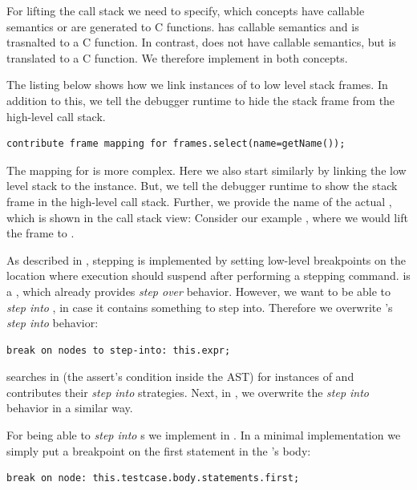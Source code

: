  For lifting the call stack we need to specify, which
concepts have callable semantics or are generated to C functions. 
 has callable semantics and is trasnalted to a C
function. In contrast,  does not have callable
semantics, but is translated to a C function. We therefore implement 
 in both concepts.

The listing below shows how we link instances of
 to low level stack frames. In addition to this, we
tell the debugger runtime to hide the stack frame from the high-level call stack.

\begin{lstlisting}[language=mbeddr,frame=single]
contribute frame mapping for frames.select(name=getName());
\end{lstlisting}


The mapping for  is more complex. Here we also start similarly by
linking the low level stack to the  instance. But, we tell the
debugger runtime to show the stack frame in the high-level call stack.
Further, we provide the name of the actual , which is shown in the
call stack view: Consider our example , where we would
lift the frame  to .

 As described in , stepping is
implemented by setting low-level breakpoints on the 
location where execution should suspend after
performing a stepping command.  is a , which
already provides \emph{step over} behavior. However, we want to be able to 
\emph{step into} , in case it contains something to step into. 
Therefore we overwrite 's \emph{step into} behavior: 
\begin{lstlisting}[language=mbeddr,frame=single]
break on nodes to step-into: this.expr;
\end{lstlisting}

 searches in  (the assert's condition inside
the \ac{AST}) for instances of  and contributes their 
\emph{step into} strategies. Next, in , we overwrite
the \emph{step into} behavior in a similar way.

For being able to \emph{step into} s we implement
 in . In a minimal implementation we simply put
a breakpoint on the first statement in the 's body:
\begin{lstlisting}[language=mbeddr,frame=single]
break on node: this.testcase.body.statements.first;
\end{lstlisting}

